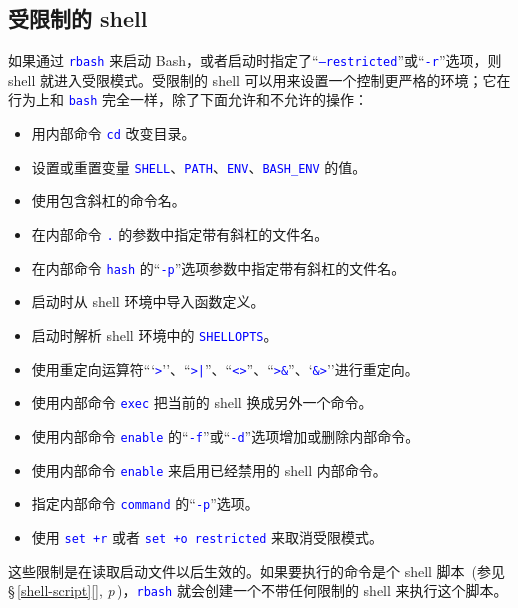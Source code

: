 \documentclass[openany,notitlepage]{book}
\newcommand{\code}[1]{\textcolor{blue}{{\tt #1}}}
\newcommand{\fullref}[1]{\,\S\,\ref{#1}[\nameref{#1}], \textit{p\pageref{#1}}\,}
\begin{document}
\begin{CJK}{UTF8}{song}
\section{受限制的 shell}\label{restricted-shell} %
如果通过 \code{rbash} 来启动 Bash，或者启动时指定了``\code{--restricted}''或``\code{-r}''选项，则 shell 就进入受限模式。受限制的 shell 可以用来设置一个控制更严格的环境；它在行为上和 \code{bash} 完全一样，除了下面允许和不允许的操作：
\begin{itemize}
    \item 用内部命令 \code{cd} 改变目录。
    \item 设置或重置变量 \code{SHELL}、\code{PATH}、\code{ENV}、\code{BASH\_ENV} 的值。
    \item 使用包含斜杠的命令名。
    \item 在内部命令 \code{.} 的参数中指定带有斜杠的文件名。
    \item 在内部命令 \code{hash} 的``\code{-p}''选项参数中指定带有斜杠的文件名。
    \item 启动时从 shell 环境中导入函数定义。
    \item 启动时解析 shell 环境中的 \code{SHELLOPTS}。
    \item 使用重定向运算符```\code{>}''、``\code{>|}''、``\code{<>}''、``\code{>\&}''、`\code{\&>}''进行重定向。
    \item 使用内部命令 \code{exec} 把当前的 shell 换成另外一个命令。
    \item 使用内部命令 \code{enable} 的``\code{-f}''或``\code{-d}''选项增加或删除内部命令。
    \item 使用内部命令 \code{enable} 来启用已经禁用的 shell 内部命令。
    \item 指定内部命令 \code{command} 的``\code{-p}''选项。
    \item 使用 \code{set +r} 或者 \code{set +o restricted} 来取消受限模式。
\end{itemize}
这些限制是在读取启动文件以后生效的。如果要执行的命令是个 shell 脚本~(参见\fullref{shell-script})，\code{rbash} 就会创建一个不带任何限制的 shell 来执行这个脚本。


\end{CJK}
\end{document}

